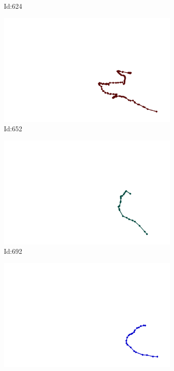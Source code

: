 \documentclass[12pt,twoside]{report}
\begin{document}
\begin{figure}
\begin{subfigure}[b]{0.20\textwidth}
\caption{Id:624}
\end{subfigure}
\begin{subfigure}[b]{0.20\textwidth}
\centering
\includegraphics[width=\textwidth]{../trajectories/652.png}
\caption{Id:652}
\end{subfigure}
\begin{subfigure}[b]{0.20\textwidth}
\centering
\includegraphics[width=\textwidth]{../trajectories/692.png}
\caption{Id:692}
\end{subfigure}
\begin{subfigure}[b]{0.20\textwidth}
\centering
\includegraphics[width=\textwidth]{../trajectories/714.png}

\end{subfigure}
\end{figure}
\end{document}
